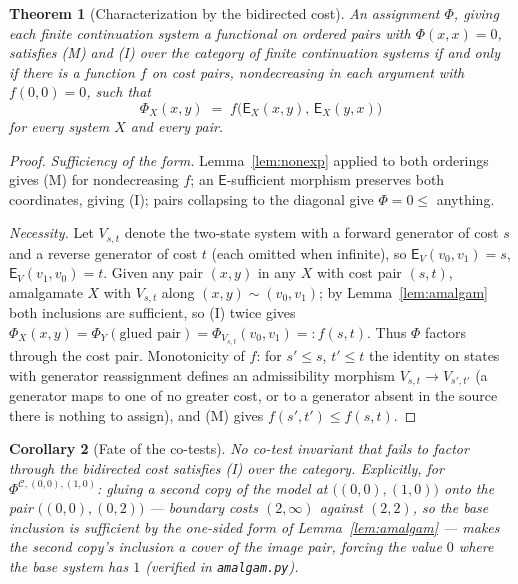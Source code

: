 \documentclass[11pt]{article}
\newtheorem{theorem}{Theorem}[section]
\newtheorem{corollary}[theorem]{Corollary}
\theoremstyle{remark}
\newcommand{\C}{\mathcal{C}}
\newcommand{\E}{\mathsf{E}}
\begin{document}
\begin{theorem}[Characterization by the bidirected cost]
\label{thm:main}
An assignment $\Phi$, giving each finite continuation system a
functional on ordered pairs with $\Phi(x,x)=0$, satisfies (M) and (I)
over the category of finite continuation systems if and only if there
is a function $f$ on cost pairs, nondecreasing in each argument with
$f(0,0)=0$, such that
\[
\Phi_{X}(x,y) \;=\; f\bigl(\E_{X}(x,y),\,\E_{X}(y,x)\bigr)
\]
for every system $X$ and every pair.
\end{theorem}

\begin{proof}
\emph{Sufficiency of the form.} Lemma~\ref{lem:nonexp} applied to
both orderings gives (M) for nondecreasing $f$; an $\E$-sufficient
morphism preserves both coordinates, giving (I); pairs collapsing to
the diagonal give $\Phi=0\le$ anything.

\emph{Necessity.} Let $V_{s,t}$ denote the two-state system with a
forward generator of cost $s$ and a reverse generator of cost $t$
(each omitted when infinite), so $\E_{V}(v_0,v_1)=s$,
$\E_{V}(v_1,v_0)=t$. Given any pair $(x,y)$ in any $X$ with cost pair
$(s,t)$, amalgamate $X$ with $V_{s,t}$ along
$(x,y)\sim(v_0,v_1)$; by Lemma~\ref{lem:amalgam} both inclusions are
sufficient, so (I) twice gives
$\Phi_{X}(x,y) = \Phi_{Y}(\text{glued pair}) = \Phi_{V_{s,t}}(v_0,v_1)
=: f(s,t)$. Thus $\Phi$ factors through the cost pair. Monotonicity
of $f$: for $s'\le s$, $t'\le t$ the identity on states with
generator reassignment defines an admissibility morphism
$V_{s,t}\to V_{s',t'}$ (a generator maps to one of no greater cost,
or to a generator absent in the source there is nothing to assign),
and (M) gives $f(s',t')\le f(s,t)$.
\end{proof}

\begin{corollary}[Fate of the co-tests]\label{cor:cotest}
No co-test invariant that fails to factor through the bidirected cost
satisfies (I) over the category. Explicitly, for
$\Phi^{\C,(0,0),(1,0)}$: gluing a second copy of the model at
$\bigl((0,0),(1,0)\bigr)$ onto the pair $\bigl((0,0),(0,2)\bigr)$ ---
boundary costs $(2,\infty)$ against $(2,2)$, so the base inclusion is
sufficient by the one-sided form of Lemma~\ref{lem:amalgam} --- makes
the second copy's inclusion a cover of the image pair, forcing the
value $0$ where the base system has $1$ (verified in
\texttt{amalgam.py}).
\end{corollary}
\end{document}
